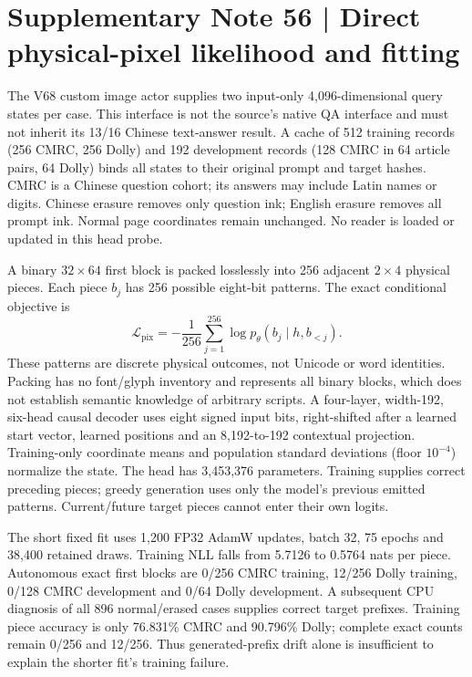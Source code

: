 \documentclass[10pt,a4paper]{article}
\begin{document}
\clearpage
\section*{Supplementary Note 56 | Direct physical-pixel likelihood and fitting}
\label{note:pixel-density}
The V68 custom image actor supplies two input-only 4,096-dimensional query
states per case. This interface is not the source's native QA interface and
must not inherit its 13/16 Chinese text-answer result. A cache of 512 training
records (256 CMRC, 256 Dolly) and 192 development records (128 CMRC in 64
article pairs, 64 Dolly) binds all states to their original prompt and target
hashes. CMRC is a Chinese question cohort; its answers may include Latin names
or digits. Chinese erasure removes only question ink; English erasure removes
all prompt ink. Normal page coordinates remain unchanged. No reader is loaded
or updated in this head probe.

A binary $32\times64$ first block is packed losslessly into 256 adjacent
$2\times4$ physical pieces. Each piece $b_j$ has 256 possible eight-bit
patterns. The exact conditional objective is
\[
\mathcal L_{\mathrm{pix}}=-\frac{1}{256}\sum_{j=1}^{256}
\log p_\theta(b_j\mid h,b_{<j}).
\]
These patterns are discrete physical outcomes, not Unicode or word identities.
Packing has no font/glyph inventory and represents all binary blocks, which
does not establish semantic knowledge of arbitrary scripts. A four-layer,
width-192, six-head causal decoder uses eight signed input bits, right-shifted
after a learned start vector, learned positions and an 8,192-to-192 contextual
projection. Training-only coordinate means and population standard deviations
(floor $10^{-4}$) normalize the state. The head has 3,453,376 parameters.
Training supplies correct preceding pieces; greedy generation uses only the
model's previous emitted patterns. Current/future target pieces cannot enter
their own logits.

The short fixed fit uses 1,200 FP32 AdamW updates, batch 32, 75 epochs and
38,400 retained draws. Training NLL falls from 5.7126 to 0.5764 nats per piece.
Autonomous exact first blocks are 0/256 CMRC training, 12/256 Dolly training,
0/128 CMRC development and 0/64 Dolly development. A subsequent CPU diagnosis
of all 896 normal/erased cases supplies correct target prefixes. Training
piece accuracy is only 76.831\% CMRC and 90.796\% Dolly; complete exact counts
remain 0/256 and 12/256. Thus generated-prefix drift alone is insufficient to
explain the shorter fit's training failure.
\end{document}
